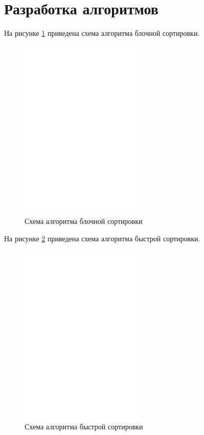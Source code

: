 \section{Разработка алгоритмов}

На рисунке \ref{pic:blocksort} приведена схема алгоритма блочной сортировки.

\begin{figure}[H]
	\centering
	\includegraphics[scale=0.62]{assets/blocksort.pdf}
	\caption{Схема алгоритма блочной сортировки}
	\label{pic:blocksort}
\end{figure}

\newpage

На рисунке \ref{pic:quicksort} приведена схема алгоритма быстрой сортировки.

\begin{figure}[H]
	\centering
	\includegraphics[scale=0.62]{assets/quicksort.pdf}
	\caption{Схема алгоритма быстрой сортировки}
	\label{pic:quicksort}
\end{figure}

